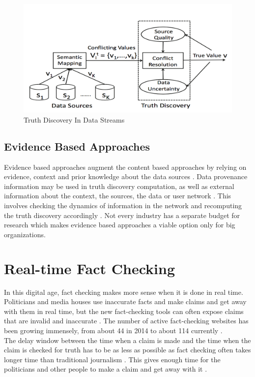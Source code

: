 \documentclass[sigconf]{acmart}
\begin{document}
\begin{figure}
\includegraphics[width=1.0\textwidth]{images/fig1.png}
\caption{Truth Discovery In Data Streams \cite{Zhao2014}}
\label{fig:Fig1}
\end{figure}

\subsection{Evidence Based Approaches}
Evidence based approaches augment the content based approaches by relying on evidence, context and prior knowledge about the data sources \cite{Berti-Equille2016}. Data provenance information may be used in truth discovery computation, as well as external information about the context, the sources, the data or user network \cite{Berti-Equille2016}. This involves checking the dynamics of information in the network and recomputing the truth discovery accordingly \cite{Berti-Equille2016}. Not every industry has a separate budget for research which makes evidence based approaches a viable option only for big organizations.

\section{Real-time Fact Checking}
In this digital age, fact checking makes more sense when it is done in real time. Politicians and media houses use inaccurate facts and make claims and get away with them in real time, but the new fact-checking tools can often expose claims that are invalid and inaccurate \cite{Hassan2015}.  The number of active fact-checking websites has been growing immensely, from about 44 in 2014 to about 114 currently \cite{Hassan2015}. \\
The delay window between the time when a claim is made and the time when the claim is checked for truth has to be as less as possible as fact checking often takes longer time than traditional journalism \cite{Hassan2015}. This gives enough time for the politicians and other people to make a claim and get away with it \cite{Hassan2015}.
\end{document}
